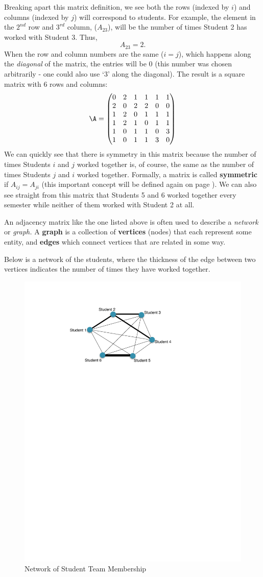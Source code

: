 \documentclass[
]{article}
\theoremstyle{definition}
\theoremstyle{definition}
\theoremstyle{definition}
\theoremstyle{definition}
\theoremstyle{remark}
\begin{document}
Breaking apart this matrix definition, we see both the rows (indexed by \(i\)) and columns (indexed by \(j\)) will correspond to students. For example, the element in the \(2^{nd}\) row and \(3^{rd}\) column, (\(A_{23}\)), will be the number of times Student 2 has worked with Student 3. Thus,
\[A_{23}=2.\]
When the row and column numbers are the same (\(i=j\)), which happens along the \emph{diagonal} of the matrix, the entries will be 0 (this number was chosen arbitrarily - one could also use `3' along the diagonal). The result is a square matrix with 6 rows and columns:
\[\A=\left(\begin{matrix} 0&2&1&1&1&1\\2&0&2&2&0&0\\1&2&0&1&1&1\\1&2&1&0&1&1\\1&0&1&1&0&3\\1&0&1&1&3&0\end{matrix}\right)\]
We can quickly see that there is symmetry in this matrix because the number of times Students \(i\) and \(j\) worked together is, of course, the same as the number of times Students \(j\) and \(i\) worked together. Formally, a matrix is called \textbf{symmetric} if \(A_{ij}=A_{ji}\) (this important concept will be defined again on page \pageref{symmetric}). We can also see straight from this matrix that Students 5 and 6 worked together every semester while neither of them worked with Student 2 at all.

An adjacency matrix like the one listed above is often used to describe a \emph{network} or \emph{graph.} A \textbf{graph} is a collection of \textbf{vertices} (nodes) that each represent some entity, and \textbf{edges} which connect vertices that are related in some way.

Below is a network of the students, where the thickness of the edge between two vertices indicates the number of times they have worked together.

\begin{figure}

{\centering \includegraphics[width=0.5\linewidth]{figs/studentgraph} 

}

\caption{Network of Student Team Membership}\label{fig:unnamed-chunk-7}
\end{figure}
\end{document}
